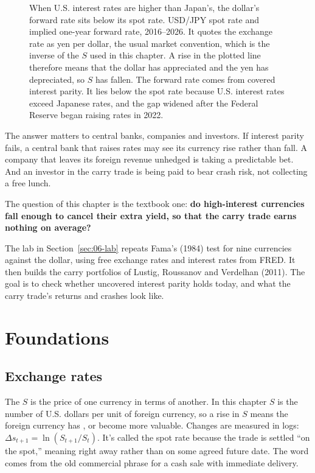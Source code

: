 \begin{figure}[htbp]
{%
}
\caption{When U.S. interest rates are higher than Japan's, the dollar's forward rate sits below its spot rate. USD/JPY spot rate and implied one-year forward rate, 2016--2026. 
It quotes the exchange rate as yen per dollar, the usual market convention, which is the inverse of the $S$ used in this chapter. A rise in the plotted line therefore means that the dollar has appreciated and the yen has depreciated, so $S$ has fallen.
The forward rate comes from covered interest parity. It lies below the spot rate because U.S. interest rates exceed Japanese rates, and the gap widened after the Federal Reserve began raising rates in 2022.}
\label{fig:06-usdjpy}
\end{figure}


The answer matters to central banks, companies and investors. If interest parity fails, a central bank that raises rates may see its currency rise rather than fall. A company that leaves its foreign revenue unhedged is taking a predictable bet. And an investor in the carry trade is being paid to bear crash risk, not collecting a free lunch. 

The question of this chapter is the textbook one: \textbf{do high-interest currencies fall enough to cancel their extra yield, so that the carry trade earns nothing on average?}

The lab in Section~\ref{sec:06-lab} repeats Fama's (1984) test for nine currencies against the dollar, using free exchange rates and interest rates from FRED. It then builds the carry portfolios of Lustig, Roussanov and Verdelhan (2011). The goal is to check whether uncovered interest parity holds today, and what the carry trade's returns and crashes look like.


\section{Foundations}
\label{sec:06-foundations}

\subsection{Exchange rates}

The  $S$ is the price of one currency in terms of another. In this chapter $S$ is the number of U.S. dollars per unit of foreign currency, so a rise in $S$ means the foreign currency has , or become more valuable. Changes are measured in logs: $\Delta s_{t+1} = \ln(S_{t+1}/S_t)$.
It’s called the spot rate because the trade is settled “on the spot,” meaning right away rather than on some agreed future date. The word comes from the old commercial phrase for a cash sale with immediate delivery.


